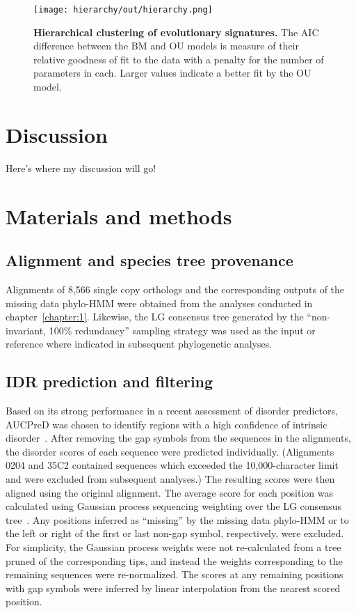 \begin{figure}[h!]
\texttt{[image: hierarchy/out/hierarchy.png]}
\centering
\caption{\textbf{Hierarchical clustering of evolutionary signatures.}
The AIC difference between the BM and OU models is measure of their relative goodness of fit to the data with a penalty for the number of parameters in each. Larger values indicate a better fit by the OU model.}
\label{fig:hierarchy}
\end{figure}

\section{Discussion}
Here's where my discussion will go!

\section{Materials and methods}

\subsection{Alignment and species tree provenance}
Alignments of 8,566 single copy orthologs and the corresponding outputs of the missing data phylo-HMM were obtained from the analyses conducted in chapter~\ref{chapter:1}. Likewise, the LG consensus tree generated by the ``non-invariant, 100\% redundancy'' sampling strategy was used as the input or reference where indicated in subsequent phylogenetic analyses.

\subsection{IDR prediction and filtering}
Based on its strong performance in a recent assessment of disorder predictors, AUCPreD was chosen to identify regions with a high confidence of intrinsic disorder~\cite{Wang2016, Necci2021}. After removing the gap symbols from the sequences in the alignments, the disorder scores of each sequence were predicted individually. (Alignments 0204 and 35C2 contained sequences which exceeded the 10,000-character limit and were excluded from subsequent analyses.) The resulting scores were then aligned using the original alignment. The average score for each position was calculated using Gaussian process sequencing weighting over the LG consensus tree~\cite{Altschul1989}. Any positions inferred as ``missing'' by the missing data phylo-HMM or to the left or right of the first or last non-gap symbol, respectively, were excluded. For simplicity, the Gaussian process weights were not re-calculated from a tree pruned of the corresponding tips, and instead the weights corresponding to the remaining sequences were re-normalized. The scores at any remaining positions with gap symbols were inferred by linear interpolation from the nearest scored position.


